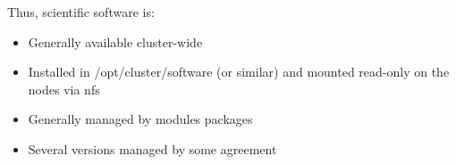 Thus, scientific software is:
\begin{itemize}
    \item Generally available cluster-wide 
    \item Installed in /opt/cluster/software (or similar) and mounted read-only on the nodes via nfs
    \item Generally managed by modules packages 
    \item Several versions managed by some agreement
\end{itemize}




